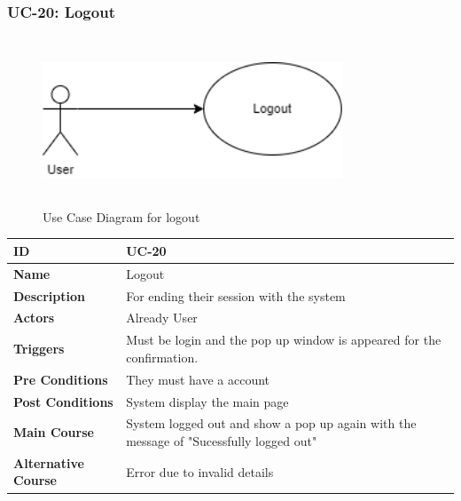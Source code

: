     \subsubsection{UC-20: Logout}
    \begin{figure}[H]
        \includegraphics[height=5cm, width=0.8\textwidth]{./diagrams/Use Case/logout.png}
        \centering 
        \caption{Use Case Diagram for logout}
        \label{Usecase1}
        \end{figure}
        
    
    \begin{center}
        \begin{tabularx}{\textwidth}{|l|X|}
            \hline
            \textbf{ID} & UC-20 \\
            \hline
            \textbf{Name} & Logout \\
            \hline
            \textbf{Description} & For ending their session with the system \\
            \hline
            \textbf{Actors} & Already User \\
            \hline
            \textbf{Triggers} & Must be login and the pop up window is appeared for the confirmation. \\
            \hline
            \textbf{Pre Conditions} & They must have a account \\
            \hline
            \textbf{Post Conditions} & System display the main page  \\
            \hline
            \textbf{Main Course} & System logged out and show a pop up again with the message of "Sucessfully logged out" \\
            \hline
            \textbf{Alternative Course} & Error due to invalid details \\
            \hline
            
        \end{tabularx}
    \end{center}
    \newpage
    

    

  